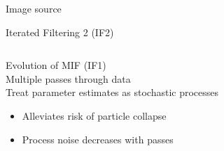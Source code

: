 \documentclass[12pt]{beamer}
\begin{document}
\begin{frame}
\begin{columns}
\begin{column}{0.55\textwidth}
		\end{column}
	\end{columns}

	\centering
	\tiny
	Image source \cite{Doucet2001}

\end{frame}

\begin{frame}

	\null
	\hspace{-0.475cm}
	\large
	Iterated Filtering 2 (IF2)
	\vspace{0.5\baselineskip}

	\begin{columns}
		\begin{column}[t]{0.5\textwidth}

			\footnotesize
			Evolution of MIF (IF1) \\
			\vspace{\baselineskip}
			Multiple passes through data \\
			\vspace{\baselineskip}
			Treat parameter estimates as stochastic processes
			\begin{itemize}
				\footnotesize
				\item Alleviates risk of particle collapse
				\item Process noise decreases with passes
			\end{itemize}

			
		\end{column}
		\begin{column}[t]{0.5\textwidth}


\end{column}
\end{columns}
\end{frame}
\end{document}
